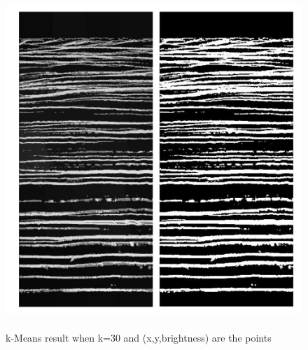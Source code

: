 \documentclass[11pt,psfig]{article}
\begin{document}
\begin{figure}[H]
\centering
\includegraphics[height=5in]{complex_k_MeansResults.jpg}
\caption{k-Means result when k=30 and (x,y,brightness) are the points}
\end{figure}
\end{document}
